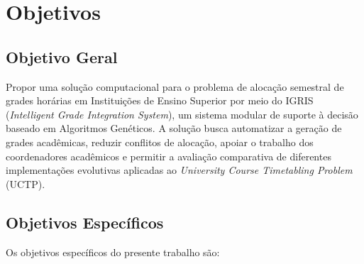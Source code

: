 \section{Objetivos}

\subsection{Objetivo Geral}

Propor uma solução computacional para o problema de alocação semestral de grades horárias em Instituições de Ensino Superior por meio do IGRIS (\textit{Intelligent Grade Integration System}), um sistema modular de suporte à decisão baseado em Algoritmos Genéticos. A solução busca automatizar a geração de grades acadêmicas, reduzir conflitos de alocação, apoiar o trabalho dos coordenadores acadêmicos e permitir a avaliação comparativa de diferentes implementações evolutivas aplicadas ao \textit{University Course Timetabling Problem} (UCTP).

\subsection{Objetivos Específicos}

Os objetivos específicos do presente trabalho são:

